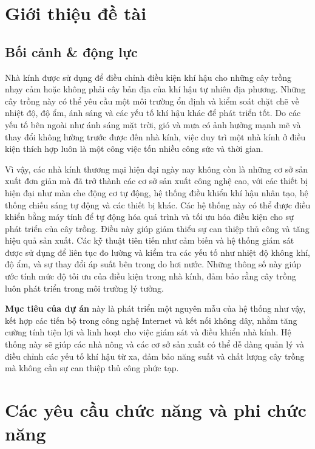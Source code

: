 \section{Giới thiệu đề tài}

\subsection{Bối cảnh \& động lực}

Nhà kính được sử dụng để điều chỉnh điều kiện khí hậu cho những cây trồng nhạy cảm hoặc không phải cây bản địa của khí hậu tự nhiên địa phương. Những cây trồng này có thể yêu cầu một môi trường ổn định và kiểm soát chặt chẽ về nhiệt độ, độ ẩm, ánh sáng và các yếu tố khí hậu khác để phát triển tốt. Do các yếu tố bên ngoài như ánh sáng mặt trời, gió và mưa có ảnh hưởng mạnh mẽ và thay đổi không lường trước được đến nhà kính, việc duy trì một nhà kính ở điều kiện thích hợp luôn là một công việc tốn nhiều công sức và thời gian.

Vì vậy, các nhà kính thương mại hiện đại ngày nay không còn là những cơ sở sản xuất đơn giản mà đã trở thành các cơ sở sản xuất công nghệ cao, với các thiết bị hiện đại như màn che động cơ tự động, hệ thống điều khiển khí hậu nhân tạo, hệ thống chiếu sáng tự động và các thiết bị khác. Các hệ thống này có thể được điều khiển bằng máy tính để tự động hóa quá trình và tối ưu hóa điều kiện cho sự phát triển của cây trồng. Điều này giúp giảm thiểu sự can thiệp thủ công và tăng hiệu quả sản xuất. Các kỹ thuật tiên tiến như cảm biến và hệ thống giám sát được sử dụng để liên tục đo lường và kiểm tra các yếu tố như nhiệt độ không khí, độ ẩm, và sự thay đổi áp suất bên trong do hơi nước. Những thông số này giúp ước tính mức độ tối ưu của điều kiện trong nhà kính, đảm bảo rằng cây trồng luôn phát triển trong môi trường lý tưởng.

\textbf{Mục tiêu của dự án} này là phát triển một nguyên mẫu của hệ thống như vậy, kết hợp các tiến bộ trong công nghệ Internet và kết nối không dây, nhằm tăng cường tính tiện lợi và linh hoạt cho việc giám sát và điều khiển nhà kính. Hệ thống này sẽ giúp các nhà nông và các cơ sở sản xuất có thể dễ dàng quản lý và điều chỉnh các yếu tố khí hậu từ xa, đảm bảo năng suất và chất lượng cây trồng mà không cần sự can thiệp thủ công phức tạp.

\newpage

\section{Các yêu cầu chức năng và phi chức năng}
